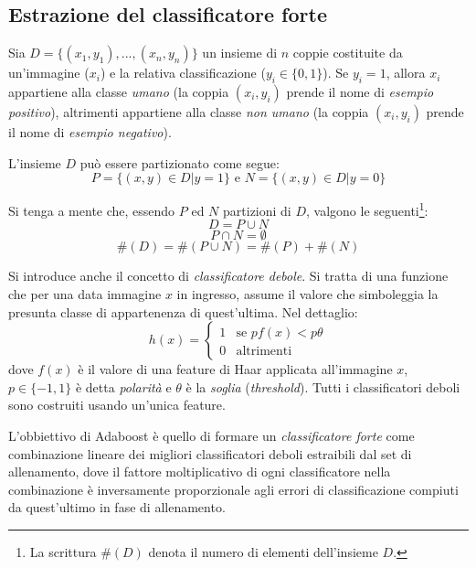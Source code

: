 
\subsection{Estrazione del classificatore forte} %
\label{sub:estrazione_del_classificatore_forte}
Sia $D = \{(x_1, y_1), ..., (x_n, y_n)\}$ un insieme di $n$ coppie costituite da un'immagine ($x_i$) e la relativa classificazione ($y_i \in \{ 0, 1 \}$). Se $y_i = 1$, allora $x_i$ appartiene alla classe \emph{umano} (la coppia $(x_i, y_i)$ prende il nome di \emph{esempio positivo}), altrimenti appartiene alla classe \emph{non umano} (la coppia $(x_i, y_i)$ prende il nome di \emph{esempio negativo}).

L'insieme $D$ può essere partizionato come segue:
$$P = \{(x, y) \in D | y = 1\} \text{ e } N = \{(x,y) \in D | y = 0\}$$

Si tenga a mente che, essendo $P$ ed $N$ partizioni di $D$, valgono le seguenti\footnote{La scrittura $\#(D)$ denota il numero di elementi dell'insieme $D$.}:
\begin{equation}
    D = P \cup N
\end{equation}
\begin{equation}
    P \cap N = \emptyset
\end{equation}
\begin{equation}
    \#(D) = \#(P \cup N) = \#(P) + \#(N)
\end{equation}

Si introduce anche il concetto di \emph{classificatore debole}. Si tratta di una funzione che per una data immagine $x$ in ingresso, assume il valore che simboleggia la presunta classe di appartenenza di quest'ultima.
Nel dettaglio:
\begin{equation}
    h(x) = \begin{cases}
    1 & \text{se $pf(x) < p\theta$}\\
    0 & \text{altrimenti}
\end{cases}
\end{equation}
dove $f(x)$ è il valore di una feature di Haar applicata all'immagine $x$, $p \in \{-1,1\}$ è detta \emph{polarità} e $\theta$ è la \emph{soglia} (\emph{threshold}). Tutti i classificatori deboli sono costruiti usando un'unica feature.

L'obbiettivo di Adaboost è quello di formare un \emph{classificatore forte} come combinazione lineare dei migliori classificatori deboli estraibili dal set di allenamento, dove il fattore moltiplicativo di ogni classificatore nella combinazione è inversamente proporzionale agli errori di classificazione compiuti da quest'ultimo in fase di allenamento.

